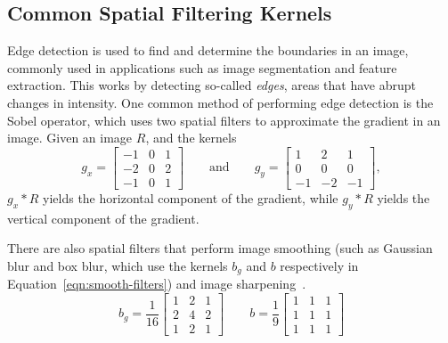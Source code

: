 \subsection{Common Spatial Filtering Kernels}
Edge detection is used to find and determine the boundaries in an image, commonly used in applications such as image segmentation and feature extraction. This works by detecting so-called \textit{edges}, areas that have abrupt changes in intensity.
One common method of performing edge detection is the Sobel operator, which uses two spatial filters to approximate the gradient in an image. Given an image $R$, and the kernels
\begin{equation}
    g_x =
    \begin{bmatrix}
        -1 & 0 & 1 \\
        -2 & 0 & 2 \\
        -1 & 0 & 1
    \end{bmatrix}
    \qquad\text{and}\qquad
    g_y =
    \begin{bmatrix}
        1 & 2 & 1 \\
        0 & 0 & 0 \\
        -1 & -2 & -1
    \end{bmatrix},
\end{equation}
$g_x \ast R$ yields the horizontal component of the gradient, while $g_y \ast R$ yields the vertical component of the gradient.

There are also spatial filters that perform image smoothing (such as Gaussian blur and box blur, which use the kernels $b_g$ and $b$ respectively in Equation~\ref{eqn:smooth-filters}) and image sharpening~\cite{gonzalez_digital_2008}.
\begin{equation}
    \label{eqn:smooth-filters}
    b_g = \frac{1}{16}
    \begin{bmatrix}
        1 & 2 & 1 \\
        2 & 4 & 2 \\
        1 & 2 & 1
    \end{bmatrix}
    \qquad
    b = \frac{1}{9}
    \begin{bmatrix}
        1 & 1 & 1 \\
        1 & 1 & 1 \\
        1 & 1 & 1
    \end{bmatrix}
\end{equation}
